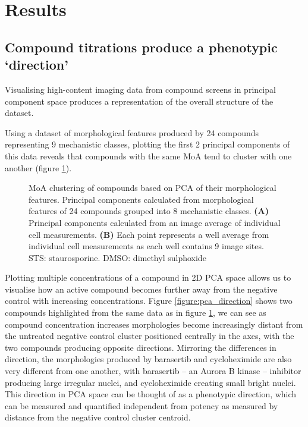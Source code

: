\documentclass[a4paper,11pt,twoside,openright]{scrbook}
\begin{document}
\section{Results}

\subsection{Compound titrations produce a phenotypic `direction'}
 
Visualising high-content imaging data from compound screens in principal component space produces a representation of 
the overall structure of the dataset.

Using a dataset of morphological features produced by 24 compounds representing 9 mechanistic classes, plotting the 
first 2 principal components of this data reveals that compounds with the same MoA tend to cluster with one another 
(figure \ref{figure:pca_clustering}).

\begin{figure}
    \captionsetup{width=0.8\textwidth}
    \caption[PCA compound clustering based on MoA]{
MoA clustering of compounds based on PCA of their morphological features. 
Principal components calculated from morphological features of 24 compounds grouped into 8 mechanistic classes.
\textbf{(A)} Principal components calculated from an image average of individual cell measurements.
\textbf{(B)} Each point represents a well average from individual cell measurements as each well contains 9 image sites.
STS: staurosporine.
DMSO: dimethyl sulphoxide
}
    
    \label{figure:pca_clustering}
\end{figure}


Plotting multiple concentrations of a compound in 2D PCA space allows us to visualise how an active compound becomes 
further away from the negative control with increasing concentrations.
Figure \ref{figure:pca_direction} shows two compounds highlighted from the same data as in figure 
\ref{figure:pca_clustering}, we can see as compound concentration increases morphologies become increasingly distant 
from the untreated negative control cluster positioned centrally in the axes, with the two compounds producing opposite 
directions.
Mirroring the differences in direction, the morphologies produced by barasertib and cycloheximide are also very 
different from one another, with barasertib -- an Aurora B kinase -- inhibitor producing large irregular nuclei, and 
cycloheximide creating small bright nuclei.
This direction in PCA space can be thought of as a phenotypic direction, which can be measured and quantified 
independent from potency as measured by distance from the negative control cluster centroid.
\end{document}
